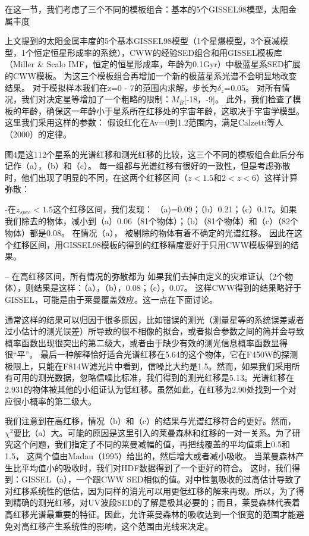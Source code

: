 在这一节，我们考虑了三个不同的模板组合：基本的5个GISSEL98模型，太阳金属丰度
 
上文提到的太阳金属丰度的5个基本GISSEL98模型（1个星爆模型，3个衰减模型，1个恒定恒星形成率的系统），CWW的经验SED组合和用GISSEL模板库（Miller \& Scalo IMF，恒定的恒星形成率，年龄为0.1Gyr）中极蓝星系SED扩展的CWW模板。
为这三个模板组合再增加一个新的极蓝星系光谱不会明显地改变结果。
对于模拟样本我们在z=0 - 7的范围内求解，步长为$\delta_z$=0.05。
对所有情况，我们对决定星等增加了一个粗略的限制：$M_B$[-18，-9]。
此外，我们检查了模板的年龄，确保这一年龄小于星系所在红移处的宇宙年龄，这取决于宇宙学模型。
这里我们采用这样的参数：
假设红化在Av=0到1.2范围内，满足Calzetti等人（2000）的定律。
 
 
 
 
图4是这112个星系的光谱红移和测光红移的比较，这三个不同的模板组合此后分布记作（a），（b）和（c）。
每一组都与光谱红移有很好的一致性，但是考虑弥散时，他们出现了明显的不同，在这两个红移区间（$z<1.5和2<z<6$）这样计算弥散：
 
-在$z_{spec}< 1.5$这个红移区间，我们发现：
（a)=0.09；（b）0.21；（c）0.17。如果我们除去的物体，减小到（a）0.06（81个物体）；（b）（81个物体）和（c）（82个物体）都是0.08。
在情况（a）， 被剔除的物体有着不确定的光谱红移。
因此在这个红移区间，用GISSEL98模板的得到的红移精度要好于只用CWW模板得到的结果。
 
-- 在高红移区间，所有情况的弥散都为
如果我们去掉由定义的灾难证认（2个物体），则结果是这样：（a），（b），0.08；（c），0.07。
这样CWW得到的结果略好于GISSEL，可能是由于莱曼覆盖效应。这一点在下面讨论。
 
通常这样的结果可以归因于很多原因，比如错误的测光（测量星等的系统误差或者过小估计的测光误差）所导致的很不相像的拟合，或者拟合参数之间的简并会导致概率函数出现很突出的第二级大，或者由于缺少有效的测光信息概率函数显得很“平”。
最后一种解释恰好适合光谱红移在5.64的这个物体，它在F450W的探测极限上，只能在F814W滤光片中看到，信噪比大约是1.5。然而，如果我们采用所有可用的测光数据，忽略信噪比标准，我们得到的测光红移是5.13。光谱红移在2.931的物体被其他的小组证认为低红移。虽然如此，在红移为2.90处找到一个对应很小概率的第二级大。
 
我们注意到在高红移，情况（b）和（c）的结果与光谱红移符合的更好。然而，$ \chi^2$要比（a）大。可能的原因是这里引入的莱曼森林和红移的一对一关系。为了研究这个问题，我们指定了不同的莱曼减幅的值，再把线覆盖的平均值乘上0.5和1.5，
这两个值由Madau（1995）给出的，然后增大或者减小吸收。
当莱曼森林产生比平均值小的吸收时，我们对HDF数据得到了一个更好的符合。
这时，我们得到：GISSEL（a），一个跟CWW SED相似的值。对中性氢吸收的过高估计导致了对红移系统性的低估，因为同样的消光可以用更低红移的解来再现。所以，为了得到精确的测光红移，对UV波段SED的了解是极其必要的；而且，莱曼森林代表着高红移光谱最重要的特征。因此，允许莱曼森林的吸收达到一个很宽的范围才能避免对高红移产生系统性的影响，这个范围由光线来决定。
 
